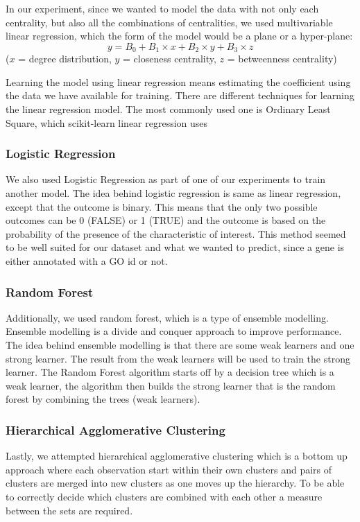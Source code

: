 \documentclass[9pt]{article}
\begin{document}
In our experiment, since we wanted to model the data with not only each centrality, but also all the combinations of centralities, we used multivariable linear regression, which the form of the model would be a plane or a hyper-plane:
\begin{equation}
y=B_0 + B_1\times{x} + B_2\times{y} + B_3\times{z}  
\end{equation}
(\(x\) = degree distribution, \(y\) = closeness centrality, \(z\) = betweenness centrality)

Learning the model using linear regression means estimating the coefficient using the data we have available for training. There are different techniques for learning the linear regression model. The most commonly used one is Ordinary Least Square, which scikit-learn linear regression uses

\subsubsection{Logistic Regression}
We also used Logistic Regression as part of one of our experiments to train another model. The idea behind logistic regression is same as linear regression, except that the outcome is binary. This means that the only two possible outcomes can be 0 (FALSE) or 1 (TRUE) and the outcome is based on the probability of the presence of the characteristic of interest. This method seemed to be well suited for our dataset and what we wanted to predict, since a gene is either annotated with a GO id or not. 

\subsubsection{Random Forest}
Additionally, we used random forest, which is a type of ensemble modelling. Ensemble modelling is a divide and conquer approach to improve performance. The idea behind ensemble modelling is that there are some weak learners and one strong learner. The result from the weak learners will be used to train the strong learner. The Random Forest algorithm starts off by a decision tree which is a weak learner, the algorithm then builds the strong learner that is the random forest by combining the trees (weak learners).

\subsubsection{Hierarchical Agglomerative Clustering}
Lastly, we attempted hierarchical agglomerative clustering which is a bottom up approach where each observation start within their own clusters and pairs of clusters are merged into new clusters as one moves up the hierarchy. To be able to correctly decide which clusters are combined with each other a measure between the sets are required. 
\end{document}
